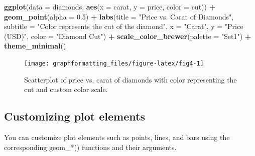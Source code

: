 \documentclass[
]{book}
\newenvironment{Shaded}{\begin{snugshade}}{\end{snugshade}}
\newcommand{\AttributeTok}[1]{\textcolor[rgb]{0.13,0.29,0.53}{#1}}
\newcommand{\FloatTok}[1]{\textcolor[rgb]{0.00,0.00,0.81}{#1}}
\newcommand{\FunctionTok}[1]{\textcolor[rgb]{0.13,0.29,0.53}{\textbf{#1}}}
\newcommand{\NormalTok}[1]{#1}
\newcommand{\SpecialCharTok}[1]{\textcolor[rgb]{0.81,0.36,0.00}{\textbf{#1}}}
\newcommand{\StringTok}[1]{\textcolor[rgb]{0.31,0.60,0.02}{#1}}
\begin{document}
\begin{Shaded}
\begin{Highlighting}[]
\FunctionTok{ggplot}\NormalTok{(}\AttributeTok{data =}\NormalTok{ diamonds, }\FunctionTok{aes}\NormalTok{(}\AttributeTok{x =}\NormalTok{ carat, }\AttributeTok{y =}\NormalTok{ price, }\AttributeTok{color =}\NormalTok{ cut)) }\SpecialCharTok{+}
  \FunctionTok{geom\_point}\NormalTok{(}\AttributeTok{alpha =} \FloatTok{0.5}\NormalTok{) }\SpecialCharTok{+}
  \FunctionTok{labs}\NormalTok{(}\AttributeTok{title =} \StringTok{"Price vs. Carat of Diamonds"}\NormalTok{,}
       \AttributeTok{subtitle =} \StringTok{"Color represents the cut of the diamond"}\NormalTok{,}
       \AttributeTok{x =} \StringTok{"Carat"}\NormalTok{,}
       \AttributeTok{y =} \StringTok{"Price (USD)"}\NormalTok{,}
       \AttributeTok{color =} \StringTok{"Diamond Cut"}\NormalTok{) }\SpecialCharTok{+}
  \FunctionTok{scale\_color\_brewer}\NormalTok{(}\AttributeTok{palette =} \StringTok{"Set1"}\NormalTok{) }\SpecialCharTok{+}
  \FunctionTok{theme\_minimal}\NormalTok{()}
\end{Highlighting}
\end{Shaded}

\begin{figure}
\texttt{[image: graphformatting\_files/figure-latex/fig4-1]} \caption{Scatterplot of price vs. carat of diamonds with color representing the cut and custom color scale.}\label{fig:fig4}
\end{figure}

\hypertarget{customizing-plot-elements}{%
\subsection{Customizing plot elements}\label{customizing-plot-elements}}

You can customize plot elements such as points, lines, and bars using the corresponding geom\_*() functions and their arguments.
\end{document}
